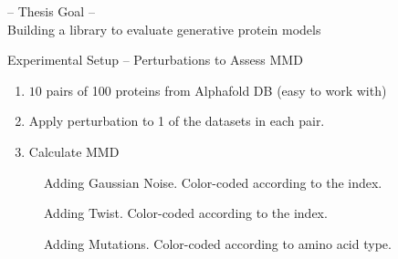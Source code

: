 \documentclass[aspectratio=169, 10pt, dvipsnames]{beamer}
\begin{document}
\begin{frame}[standout]
  -- Thesis Goal -- \\
  Building a library to evaluate generative protein models
\end{frame}

{
  \begin{frame}[fragile]{Experimental Setup -- Perturbations to Assess MMD}
    \begin{enumerate}
      \item $10$ pairs of 100 proteins from Alphafold DB (easy to work
      with)
      \item Apply perturbation to 1 of the datasets in each pair.
      \item Calculate MMD
    \end{enumerate}

  \begin{minipage}{0.3\textwidth}
    \begin{figure}
      \centering
      \caption{Adding Gaussian Noise. Color-coded according to the index.}
      \label{fig:gaussian}
    \end{figure}
  \end{minipage}
  \hfill
  \begin{minipage}{0.3\textwidth}
    \begin{figure}
      \centering
      \caption{Adding Twist. Color-coded according to the index.}
      \label{fig:twist}
    \end{figure}
  \end{minipage}
  \hfill
  \begin{minipage}{0.3\textwidth}
    \begin{figure}
      \centering
      \caption{Adding Mutations. Color-coded according to amino acid type.}
      \label{fig:mutation}
    \end{figure}
  \end{minipage}
\end{frame}
}
\end{document}
